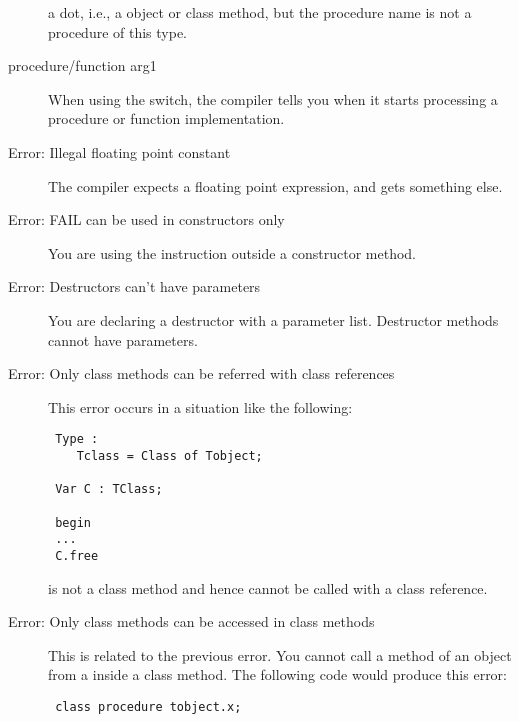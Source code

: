 \begin{description}
 a dot, i.e., a object or class method, but the procedure name is not a
 procedure of this type.
\item [procedure/function arg1]
 When using the  switch, the compiler tells you when it starts
 processing a procedure or function implementation.
\item [Error: Illegal floating point constant]
 The compiler expects a floating point expression, and gets something else.
\item [Error: FAIL can be used in constructors only]
 You are using the  instruction outside a constructor method.
\item [Error: Destructors can't have parameters]
 You are declaring a destructor with a parameter list. Destructor methods
 cannot have parameters.
\item [Error: Only class methods can be referred with class references]
 This error occurs in a situation like the following:
 \begin{verbatim}
 Type :
    Tclass = Class of Tobject;
 
 Var C : TClass;
 
 begin
 ...
 C.free
 \end{verbatim}
  is not a class method and hence cannot be called with a class
 reference.
\item [Error: Only class methods can be accessed in class methods]
 This is related to the previous error. You cannot call a method of an object
 from a inside a class method. The following code would produce this error:
 \begin{verbatim}
 class procedure tobject.x;
 

\end{verbatim}
\end{description}
